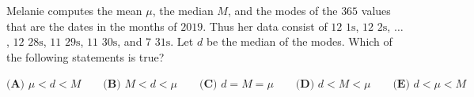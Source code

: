 Melanie computes the mean $\mu$, the median $M$, and the modes of the $365$ values that are the dates in the months of $2019$. Thus her data consist of $12$ $1\text{s}$, $12$ $2\text{s}$, $\dots$, $12$ $28\text{s}$, $11$ $29\text{s}$, $11$ $30\text{s}$, and $7$ $31\text{s}$. Let $d$ be the median of the modes. Which of the following statements is true?

$\textbf{(A) } \mu < d < M \qquad\textbf{(B) } M < d < \mu \qquad\textbf{(C) } d = M =\mu \qquad\textbf{(D) } d < M < \mu \qquad\textbf{(E) } d < \mu < M$
